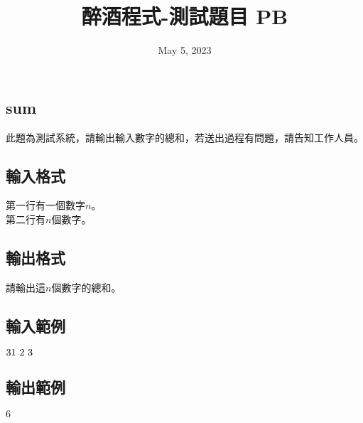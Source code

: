 \documentclass{article}
\title{醉酒程式-測試題目 PB}
\date{May 5, 2023}
\begin{document}
\begin{CJK*}{UTF8}{bsmi}

\maketitle

\section*{sum}
此題為測試系統，請輸出輸入數字的總和，若送出過程有問題，請告知工作人員。

\subsection*{輸入格式}
第一行有一個數字$n$。\\
第二行有$n$個數字。

\subsection*{輸出格式}
請輸出這$n$個數字的總和。

\subsection*{輸入範例}
$3\\1\ 2\ 3$

\subsection*{輸出範例}
$6$

\end{CJK*}
\end{document}
